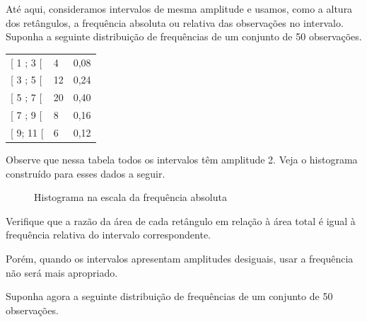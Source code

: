 Até aqui, consideramos intervalos de mesma amplitude e usamos, como a altura dos retângulos, a frequência absoluta ou relativa das observações no intervalo. Suponha a seguinte distribuição de frequências de um conjunto de 50 observações.


\begin{savenotes}\sphinxattablestart
\centering
\begin{tabulary}{\linewidth}[t]{|T|T|T|}
\hline
{}\relax &\relax &\relax \\
\hline
{[} 1 ; 3 {[}
&
4
&
0,08
\\
\hline
{[} 3 ; 5 {[}
&
12
&
0,24
\\
\hline
{[} 5 ; 7 {[}
&
20
&
0,40
\\
\hline
{[} 7 ; 9 {[}
&
8
&
0,16
\\
\hline
{[} 9; 11 {[}
&
6
&
0,12
\\
\hline
\end{tabulary}
\par
\sphinxattableend\end{savenotes}

Observe que nessa tabela todos os intervalos têm amplitude 2. Veja o histograma construído para esses dados a seguir.

\begin{figure}[H]
\centering
\capstart

\noindent{}
\caption{Histograma na escala da frequência absoluta}\label{\detokenize{PE103-4:id7}}\end{figure}

Verifique que a razão da área de cada retângulo em relação à área total é igual à frequência relativa do intervalo correspondente.

Porém, quando os intervalos apresentam amplitudes desiguais, usar a frequência não será mais apropriado.

Suponha agora a seguinte distribuição de frequências de um conjunto de 50 observações.


